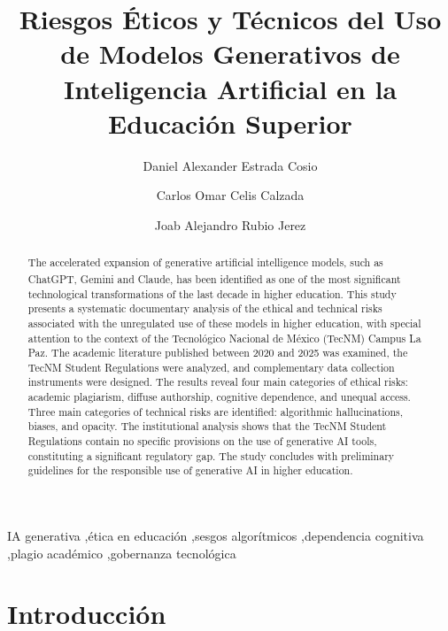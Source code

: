 \documentclass[review]{elsarticle}
\begin{document}
	
	\begin{frontmatter}
		
		\title{Riesgos Éticos y Técnicos del Uso de Modelos Generativos de Inteligencia Artificial en la Educación Superior}
		
		\author[1]{Daniel Alexander Estrada Cosio}
		\author[1]{Carlos Omar Celis Calzada}
		\author[1]{Joab Alejandro Rubio Jerez}
		
		\begin{abstract}
			The accelerated expansion of generative artificial intelligence models, such as ChatGPT\textsuperscript{\textregistered}, Gemini\textsuperscript{\textregistered} and Claude\textsuperscript{\textregistered}, has been identified as one of the most significant technological transformations of the last decade in higher education. This study presents a systematic documentary analysis of the ethical and technical risks associated with the unregulated use of these models in higher education, with special attention to the context of the Tecnológico Nacional de México (TecNM) Campus La Paz. The academic literature published between 2020 and 2025 was examined, the TecNM Student Regulations were analyzed, and complementary data collection instruments were designed. The results reveal four main categories of ethical risks: academic plagiarism, diffuse authorship, cognitive dependence, and unequal access. Three main categories of technical risks are identified: algorithmic hallucinations, biases, and opacity. The institutional analysis shows that the TecNM Student Regulations contain no specific provisions on the use of generative AI tools, constituting a significant regulatory gap. The study concludes with preliminary guidelines for the responsible use of generative AI in higher education.
		\end{abstract}
		
		\begin{keyword}
			IA generativa \sep ética en educación \sep sesgos algorítmicos \sep dependencia cognitiva \sep plagio académico \sep gobernanza tecnológica
		\end{keyword}
		
	\end{frontmatter}
	
	\section{Introducción}
	
\end{document}
